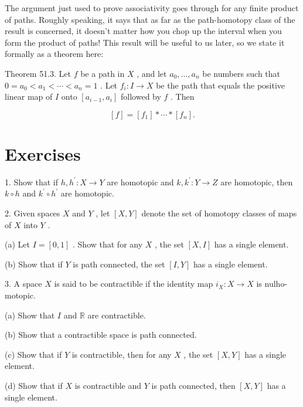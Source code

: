 \documentclass[10pt]{article}
\begin{document}
The argument just used to prove associativity goes through for any finite product of paths. Roughly speaking, it says that as far as the path-homotopy class of the result is concerned, it doesn't matter how you chop up the interval when you form the product of paths! This result will be useful to us later, so we state it formally as a theorem here:

Theorem 51.3. Let \(f\) be a path in \(X\) , and let \({a}_{0},\ldots ,{a}_{n}\) be numbers such that \(0 = {a}_{0} < {a}_{1} < \cdots  < {a}_{n} = 1\) . Let \({f}_{i} : I \rightarrow  X\) be the path that equals the positive linear map of \(I\) onto \(\left\lbrack  {{a}_{i - 1},{a}_{i}}\right\rbrack\) followed by \(f\) . Then

\[
\left\lbrack  f\right\rbrack   = \left\lbrack  {f}_{1}\right\rbrack   * \cdots  * \left\lbrack  {f}_{n}\right\rbrack  .
\]

\section*{Exercises}

1. Show that if \(h,{h}^{\prime } : X \rightarrow  Y\) are homotopic and \(k,{k}^{\prime } : Y \rightarrow  Z\) are homotopic, then \(k \circ  h\) and \({k}^{\prime } \circ  {h}^{\prime }\) are homotopic.

2. Given spaces \(X\) and \(Y\) , let \(\left\lbrack  {X,Y}\right\rbrack\) denote the set of homotopy classes of maps of \(X\) into \(Y\) .

(a) Let \(I = \left\lbrack  {0,1}\right\rbrack\) . Show that for any \(X\) , the set \(\left\lbrack  {X,I}\right\rbrack\) has a single element.

(b) Show that if \(Y\) is path connected, the set \(\left\lbrack  {I,Y}\right\rbrack\) has a single element.

3. A space \(X\) is said to be contractible if the identity map \({i}_{X} : X \rightarrow  X\) is nulho-motopic.

(a) Show that \(I\) and \(\mathbb{R}\) are contractible.

(b) Show that a contractible space is path connected.

(c) Show that if \(Y\) is contractible, then for any \(X\) , the set \(\left\lbrack  {X,Y}\right\rbrack\) has a single element.

(d) Show that if \(X\) is contractible and \(Y\) is path connected, then \(\left\lbrack  {X,Y}\right\rbrack\) has a single element.
\end{document}
